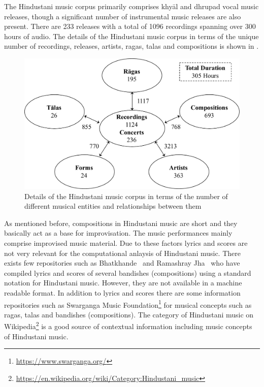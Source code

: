 The Hindustani music corpus primarily comprises khy\={a}l and dhrupad vocal music releases, though a significant number of instrumental music releases are also present. There are 233 releases with a total of 1096 recordings spanning over 300 hours of audio. The details of the Hindustani music corpus in terms of the unique number of recordings, releases, artists, \glspl{raga}, \glspl{tala} and compositions is shown in .


\begin{figure}
	\begin{center}
		\includegraphics[width=\figSizeNinety]{ch04_datasets/figures/hindustani_corpus_main.pdf}
	\end{center}
	\caption[Details of the Hindustani music corpus]{Details of the Hindustani music corpus in terms of the number of different musical entities and relationships between them}
	\label{fig:hindustani_corpus_details}
\end{figure}


As mentioned before, compositions in Hindustani music are short and they basically act as a base for improvisation. The music performances mainly comprise improvised music material. Due to these factors lyrics and scores are not very relevant for the computational anlaysis of Hindustani music. There exists few repositories such as Bhatkhande~\citep{Bhatkhande_1990} and Ramashray Jha~\citep{R_Jha_2001} who have compiled lyrics and scores of several bandishes (compositions) using a standard notation for Hindustani music. However, they are not available in a machine readable format. In addition to lyrics and scores there are some information repositories such as Swarganga Music Foundation\footnote{\url{https://www.swarganga.org/}} for musical concepts such as \glspl{raga}, \glspl{tala} and bandishes (compositions). The category of Hindustani music on Wikipedia\footnote{\url{https://en.wikipedia.org/wiki/Category:Hindustani_music}} is a good source of contextual information including music concepts of Hindustani music.

